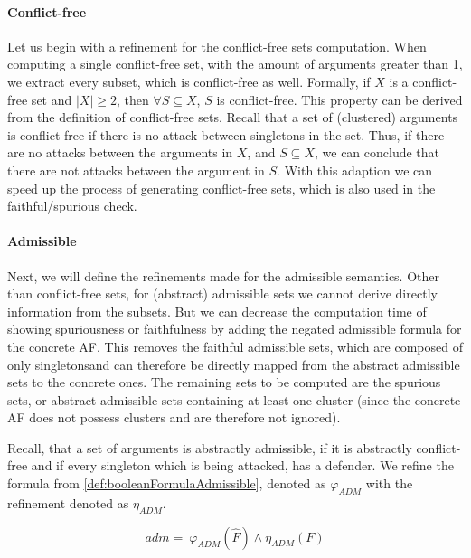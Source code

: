 \paragraph{Conflict-free} Let us begin with a refinement for the conflict-free sets computation. When computing a single conflict-free set, with the amount of arguments greater than 1, we extract every subset, which is conflict-free as well. Formally, if $X$ is a conflict-free set and $|X|\geq 2$, then $\forall S \subseteq X$, $S$ is conflict-free. This property can be derived from the definition of conflict-free sets. Recall that a set of (clustered) arguments is conflict-free if there is no attack between singletons in the set. Thus, if there are no attacks between the arguments in $X$, and $S \subseteq X$, we can conclude that there are not attacks between the argument in $S$. With this adaption we can speed up the process of generating conflict-free sets, which is also used in the faithful/spurious check.

\paragraph{Admissible} Next, we will define the refinements made for the admissible semantics. Other than conflict-free sets, for (abstract) admissible sets we cannot derive directly information from the subsets. But we can decrease the computation time of showing spuriousness or faithfulness by adding the negated admissible formula for the concrete AF. This removes the faithful admissible sets, which are composed of only singletonsand can therefore be directly mapped from the abstract admissible sets to the concrete ones. The remaining sets to be computed are the spurious sets, or abstract admissible sets containing at least one cluster (since the concrete AF does not possess clusters and are therefore not ignored).

Recall, that a set of arguments is abstractly admissible, if it is abstractly conflict-free and if every singleton which is being attacked, has a defender. We refine the formula from \cref{def:booleanFormulaAdmissible}, denoted as $\varphi_{\!A\!D\!M}$ with the refinement denoted as $\eta_{\!A\!D\!M}$.

\vspace{0.1cm}

$$
    \hat{adm}=\ \varphi_{\!A\!D\!M}(\hat{F}) \land \eta_{\!A\!D\!M}(F)
$$

\vspace{0.1cm}

